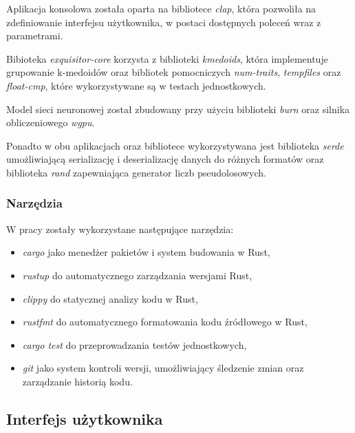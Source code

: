             Aplikacja konsolowa została oparta na bibliotece \textit{clap}\cite{Rust:clap}, która pozwoliła na zdefiniowanie interfejsu użytkownika, w postaci dostępnych poleceń wraz z parametrami.

            Bibioteka \textit{exquisitor-core} korzysta z biblioteki \textit{kmedoids}\cite{Schubert:2022}, która implementuje grupowanie k-medoidów oraz bibliotek pomocniczych \textit{num-traits}, \textit{tempfiles} oraz \textit{float-cmp}, które wykorzystywane są w testach jednostkowych.

            Model sieci neuronowej został zbudowany przy użyciu biblioteki \textit{burn}\cite{Rust:burn} oraz silnika obliczeniowego \textit{wgpu}.

            Ponadto w obu aplikacjach oraz bibliotece wykorzystywana jest biblioteka \textit{serde}\cite{Rust:serde} umożliwiającą serializację i deserializację danych do różnych formatów oraz biblioteka \textit{rand}\cite{Rust:rand} zapewniająca generator liczb pseudolosowych.

        \subsubsection{Narzędzia}
            
            W pracy zostały wykorzystane następujące narzędzia:
            \begin{itemize}
                \item \textit{cargo} jako menedżer pakietów i system budowania w Rust,
                \item \textit{rustup} do automatycznego zarządzania wersjami Rust,
                \item \textit{clippy} do statycznej analizy kodu w Rust,
                \item \textit{rustfmt} do automatycznego formatowania kodu źródłowego w Rust,
                \item \textit{cargo test} do przeprowadzania testów jednostkowych,
                \item \textit{git} jako system kontroli wersji, umożliwiający śledzenie zmian oraz zarządzanie historią kodu.
            \end{itemize}

    \subsection{Interfejs użytkownika}

